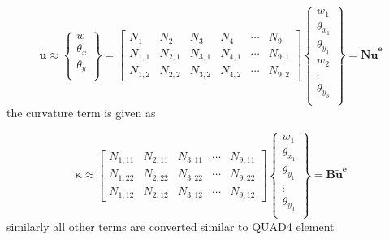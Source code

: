 \documentclass[9pt]{beamer}
\newcommand{\vect}[1]{\boldsymbol{#1}}
\begin{document}
\begin{frame}


\begin{equation*}
\tilde{\mathbf{u}}  \approx 
\left\{
\begin{array}{r}
w \\
\theta_x \\
\theta_y \\
\end{array} \right\}
=
\begin{bmatrix}
{N}_{1} & N_{2} & N_{3} &{N}_{4} &\cdots & N_{9} \\
{N}_{1,1} & N_{2,1} & N_{3,1} &{N}_{4,1} &\cdots & N_{9,1} \\
{N}_{1,2} & N_{2,2} & N_{3,2} &{N}_{4,2} &\cdots & N_{9,2} 
\end{bmatrix} 
\left\{
\begin{array}{r}
w_1 \\
\theta_{x_1} \\
\theta_{y_1} \\
w_2 \\
\vdots \\
\theta_{y_{3}} \\
\end{array} \right\}
=
\mathbf{N} \mathbf{\tilde{u}^e} 
\end{equation*}
the curvature term is given as


\begin{equation}\label{eq:kappa_KR}
\vect{ \kappa }   \approx
\begin{bmatrix}
N_{1,11} & N_{2,11} & N_{3,11} & \cdots & N_{9,11} \\
N_{1,22} & N_{2,22} & N_{3,22} & \cdots & N_{9,22} \\
N_{1,12} & N_{2,12} & N_{3,12} & \cdots & N_{9,12} 
\end{bmatrix} 
\left\{
\begin{array}{r}
w_1 \\
\theta_{x_1} \\
\theta_{y_1} \\
\vdots \\
\theta_{y_{3}} \\
\end{array} \right\}=\mathbf{ B } \mathbf{\tilde{u}^e}
\end{equation}
similarly all other terms are converted similar to QUAD4 element
\end{frame}
\end{document}
